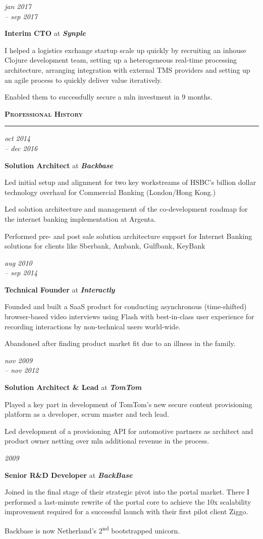 \documentclass[a4paper,11pt]{article}
\newlength{\sectionindent}
\newlength{\datemarginwidth}
\newlength{\sectionheaderindent}
\newcommand{\sectionheader}[1]{
    \vspace{1mm}
    \begin{minipage}[t]{\textwidth}
        \hspace{\sectionheaderindent}\textbf{\textsc{#1}}\\[-8pt\baselineskip] 
        \rule{\textwidth}{1pt}
    \end{minipage}\strut\vspace{3mm}}
\newcommand{\datemargin}[1]{
    \begin{minipage}[t]{\dimexpr\sectionindent-\datemarginwidth}
        \begin{flushright}
            \textit{#1}
        \end{flushright}
    \end{minipage}
    \hspace{\datemarginwidth}}
\newenvironment{summarysection}{
    \begingroup
    \setlength{\parskip}{4pt plus 2pt minus 1pt} 
}{
    \endgroup
}
\newcommand{\jobentry}[4]{
    \datemargin{#1}
    \begin{minipage}[t]{\dimexpr\textwidth-\sectionindent}
        \textbf{#2} at \textit{\textbf{#3}}\\[1pt]
        \begin{summarysection}
        #4
        \end{summarysection}
    \end{minipage}\vspace{4pt}}
\begin{document}
\jobentry{jan 2017\\-- sep 2017}{Interim CTO}{Synple}{
I helped a logistics exchange startup scale up quickly by recruiting an inhouse Clojure development team, setting up a heterogeneous real-time processing architecture, arranging integration with external TMS providers and setting up an agile process to quickly deliver value iteratively.

Enabled them to successfully secure a \EUR{1.1}mln investment in 9 months.}

\sectionheader{Professional History}
\jobentry{oct 2014\\-- dec 2016}{Solution Architect}{Backbase}{
Led initial setup and alignment for two key workstreams of HSBC’s billion dollar technology overhaul for Commercial Banking (London/Hong Kong.)

Led solution architecture and management of the co-development roadmap for the internet banking implementation at Argenta.

Performed pre- and post sale solution architecture support for Internet Banking solutions for clients like Sberbank, Ambank, Gulfbank, KeyBank}

\jobentry{aug 2010\\-- sep 2014}{Technical Founder}{Interactly}{
Founded and built a SaaS product for conducting asynchronous (time-shifted) browser-based video interviews using Flash with best-in-class user experience for recording interactions by non-technical users world-wide.

Abandoned after finding product market fit due to an illness in the family.}

\jobentry{nov 2009\\-- nov 2012}{Solution Architect \& Lead}{TomTom}{
Played a key part in development of TomTom's new secure content provisioning platform as a developer, scrum master and tech lead.

Led development of a provisioning API for automotive partners as architect and product owner netting over \EUR{1}mln additional revenue in the process.}

\jobentry{2009}{Senior R\&D Developer}{BackBase}{
Joined in the final stage of their strategic pivot into the portal market. There I performed a last-minute rewrite of the portal core to achieve the 10x scalability improvement required for a successful launch with their first pilot client Ziggo.

Backbase is now Netherland’s 2\textsuperscript{nd} bootstrapped unicorn.}
\end{document}
